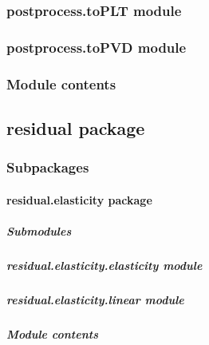 \documentclass[letterpaper,10pt,english]{sphinxmanual}
\begin{document}
\subsubsection{postprocess.toPLT module}
\label{\detokenize{postprocess:postprocess-toplt-module}}

\subsubsection{postprocess.toPVD module}
\label{\detokenize{postprocess:postprocess-topvd-module}}

\subsubsection{Module contents}
\label{\detokenize{postprocess:module-postprocess}}\label{\detokenize{postprocess:module-contents}}

\subsection{residual package}
\label{\detokenize{residual:residual-package}}\label{\detokenize{residual::doc}}

\subsubsection{Subpackages}
\label{\detokenize{residual:subpackages}}

\paragraph{residual.elasticity package}
\label{\detokenize{residual.elasticity:residual-elasticity-package}}\label{\detokenize{residual.elasticity::doc}}

\subparagraph{Submodules}
\label{\detokenize{residual.elasticity:submodules}}

\subparagraph{residual.elasticity.elasticity module}
\label{\detokenize{residual.elasticity:residual-elasticity-elasticity-module}}

\subparagraph{residual.elasticity.linear module}
\label{\detokenize{residual.elasticity:residual-elasticity-linear-module}}

\subparagraph{Module contents}
\label{\detokenize{residual.elasticity:module-residual.elasticity}}\label{\detokenize{residual.elasticity:module-contents}}
\end{document}
